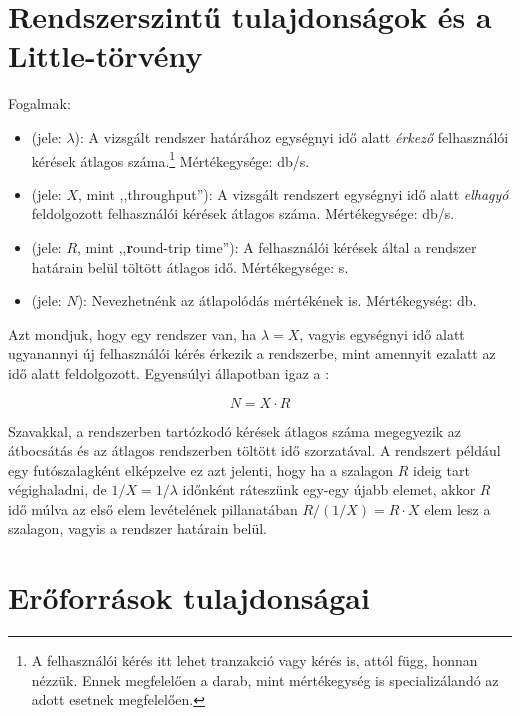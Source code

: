 \section{Rendszerszintű tulajdonságok és a Little-törvény}

\begin{definicio}
	Fogalmak:

	\begin{itemize}
		\item {} (jele: $\lambda$): A vizsgált rendszer határához egységnyi idő alatt \emph{érkező} felhasználói kérések átlagos száma.\footnote{A felhasználói kérés itt lehet tranzakció vagy kérés is, attól függ, honnan nézzük. Ennek megfelelően a darab, mint mértékegység is specializálandó az adott esetnek megfelelően.} Mértékegysége: db/s.
		\item {} (jele: $X$, mint ,,throughput''): A vizsgált rendszert egységnyi idő alatt \emph{elhagyó} feldolgozott felhasználói kérések átlagos száma. Mértékegysége: db/s.
		\item {} (jele: $R$, mint ,,\textbf{r}ound-trip time''): A felhasználói kérések által a rendszer határain belül töltött átlagos idő. Mértékegysége: s.
		\item {} (jele: $N$): Nevezhetnénk az átlapolódás mértékének is. Mértékegység: db.
	\end{itemize}
\end{definicio}

Azt mondjuk, hogy egy rendszer  van, ha $\lambda = X$, vagyis egységnyi idő alatt ugyanannyi új felhasználói kérés érkezik a rendszerbe, mint amennyit ezalatt az idő alatt feldolgozott. Egyensúlyi állapotban igaz a :

$$N = X \cdot R$$

Szavakkal, a rendszerben tartózkodó kérések átlagos száma megegyezik az átbocsátás és az átlagos rendszerben töltött idő szorzatával. A rendszert például egy futószalagként elképzelve ez azt jelenti, hogy ha a szalagon $R$ ideig tart végighaladni, de $1/X = 1/\lambda$ időnként ráteszünk egy-egy újabb elemet, akkor $R$ idő múlva az első elem levételének pillanatában $R/(1/X) = R \cdot X$ elem lesz a szalagon, vagyis a rendszer határain belül.

\section{Erőforrások tulajdonságai}

